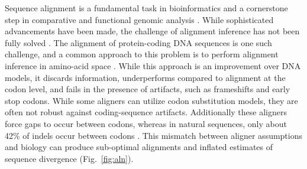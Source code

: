 \documentclass[12pt,letterpaper]{article}
\begin{document}
Sequence alignment is a fundamental task in bioinformatics and a cornerstone step in comparative and functional genomic analysis \citep{sequence_alignment_rosenberg_2009}. While sophisticated advancements have been made, the challenge of alignment inference has not been fully solved \citep{art_morrison_2015}.
%
The alignment of protein-coding DNA sequences is one such challenge, and a common approach to this problem is to perform alignment inference in amino-acid space \citep[e.g.][]{bininda2005transalign,abascal2010translatorx}. While this approach is an improvement over DNA models, it discards information, underperforms compared to alignment at the codon level, and fails in the presence of artifacts, such as frameshifts and early stop codons. While some aligners can utilize codon substitution models, they are often not robust against coding-sequence artifacts. Additionally these aligners  force gaps to occur between codons, whereas in natural sequences, only about 42\% of indels occur between codons \citep{taylor2004occurrence, zhu2022profiling}. This mismatch between aligner assumptions and biology can produce sub-optimal alignments and inflated estimates of sequence divergence (Fig.\ \ref{fig:aln}).
\end{document}
